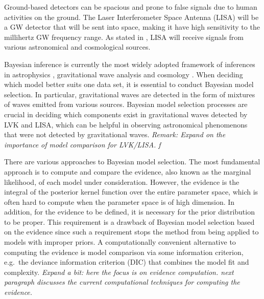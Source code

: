 \documentclass[%
 reprint,
 amsmath,amssymb,
 aps,
]{revtex4-2}
\begin{document}
Ground-based detectors can be spacious and prone to false signals due to human activities on the ground. The Laser Interferometer Space Antenna (LISA) will be a GW detector that will be sent into space, making it have high sensitivity to the millihertz GW frequency range. As stated in \cite{boileau2023prospects}, LISA will receive signals from various astronomical and cosmological sources.

Bayesian inference is currently the most widely adopted framework of inferences in astrophysics \cite{saha1994unfolding}, gravitational wave analysis \cite{christensen1998markov} and cosmology \cite{christensen2001bayesian, knox2001age}. When deciding which model better suits one data set, it is essential to conduct Bayesian model selection. In particular, gravitational waves are detected in the form of mixtures of waves emitted from various sources. Bayesian model selection processes are crucial in deciding which components exist in gravitational waves detected by LVK and LISA, which can be helpful in observing astronomical phenomenons that were not detected by gravitational waves. {\em Remark: Expand on the importance of model comparison for LVK/LISA. f}

There are various approaches to Bayesian model selection. The most fundamental approach is to compute and compare the evidence, also known as the marginal likelihood, of each model under consideration. However, the evidence is the integral of the posterior kernel function over the entire parameter space, which is often hard to compute when the parameter space is of high dimension. In addition, for the evidence to be defined, it is necessary for the prior distribution to be proper. This requirement is a drawback of Bayesian model selection based on the evidence since such a requirement stops the method from being applied to models with improper priors. 
A computationally convenient alternative to computing the evidence is model comparison via some information criterion, e.g.\ the deviance information criterion (DIC) \cite{spiegelhalter2002bayesian} that combines the model fit and complexity. {\em Expand a bit: here the focus is on evidence computation. next paragraph discusses the current computational techniques for computing the evidence. }
\end{document}
